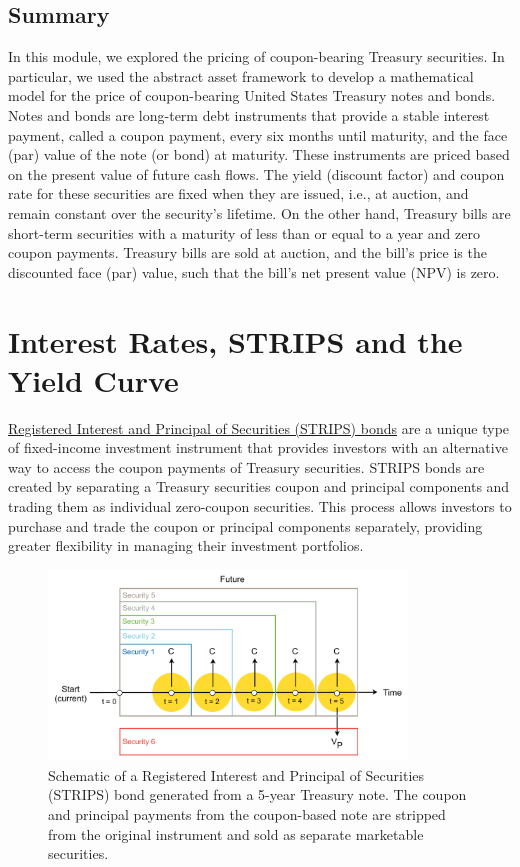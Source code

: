 \documentclass[11pt]{article}
\theoremstyle{definition}
\begin{document}
\subsection{Summary}
In this module, we explored the pricing of coupon-bearing Treasury securities.
In particular, we used the abstract asset framework to develop a mathematical model for the price of coupon-bearing United States Treasury notes and bonds.
Notes and bonds are long-term debt instruments that provide a stable interest payment, called a coupon payment, every six months until maturity, and the face (par) value of the note (or bond) at maturity.
These instruments are priced based on the present value of future cash flows. The yield (discount factor) and coupon rate for these securities are fixed when they are issued, i.e., at auction, and remain constant over the security's lifetime.
On the other hand, Treasury bills are short-term securities with a maturity of less than or equal to a year and zero coupon payments.
Treasury bills are sold at auction, and the bill's price is the discounted face (par) value, such that the bill's net present value (NPV) is zero.

\clearpage

\section{Interest Rates, STRIPS and the Yield Curve}
\href{https://en.wikipedia.org/wiki/United_States_Treasury_security#STRIPS}{Registered Interest and Principal of Securities (STRIPS) bonds} are a 
unique type of fixed-income investment instrument that provides investors with an alternative way to access the coupon payments of 
Treasury securities. STRIPS bonds are created by separating a Treasury securities coupon and principal components and trading them as individual 
zero-coupon securities. This process allows investors to purchase and trade the coupon or principal components separately, 
providing greater flexibility in managing their investment portfolios.

\begin{figure}[h]
    \centering
    \includegraphics[width=0.85\textwidth]{./figs/Fig-STRIPS-Schematic.pdf}
    \caption{Schematic of a Registered Interest and Principal of Securities (STRIPS) bond generated from a 5-year Treasury note. The coupon and principal payments from the coupon-based 
	note are stripped from the original instrument and sold as separate marketable securities.}\label{fig:strips-bond-schematic}
\end{figure}
\end{document}
